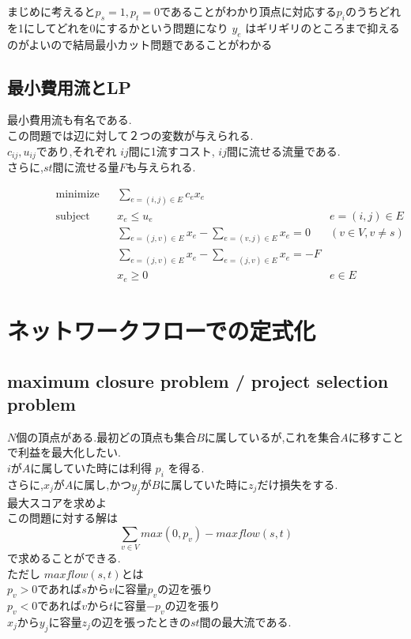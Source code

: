 \documentclass[13pt, a4paper, landscape]{jarticle}
\theoremstyle{nonitalic} %
\begin{document}
まじめに考えると$p_s=1, p_t=0$であることがわかり頂点に対応する$p_i$のうちどれを1にしてどれを0にするかという問題になり $y_e$ はギリギリのところまで抑えるのがよいので結局最小カット問題であることがわかる


\subsection{最小費用流とLP}

最小費用流も有名である. \\
この問題では辺に対して２つの変数が与えられる. \\
$c_{ij}, u_{ij}$であり,それぞれ $ij$間に1流すコスト, $ij$間に流せる流量である. \\
さらに,$st$間に流せる量$F$も与えられる.

\begin{align}
 &&&&&\textrm{minimize}   && \sum_{e=(i,j)\in E} c_e x_e  \\
 &&&&&\textrm{subject to} && x_{e} \leq u_e & e = (i,j) \in E \\
 &&&&&                    && \sum_{e = (j,v) \in E} x_e - \sum_{e=(v,j) \in E} x_e= 0 & (v \in V, v\neq s) &&&&& \\
 &&&&&                    && \sum_{e=(j,v) \in E} x_e - \sum_{e=(j,v)\in E} x_e = -F \\
 &&&&&                    && x_e \geq 0 & e \in E &&&&&
\end{align}



\section{ネットワークフローでの定式化}
\subsection{maximum closure problem / project selection problem}
$N$個の頂点がある.最初どの頂点も集合$B$に属しているが,これを集合$A$に移すことで利益を最大化したい. \\
$i$が$A$に属していた時には利得 $p_i$ を得る. \\
さらに,$x_j$が$A$に属し,かつ$y_j$が$B$に属していた時に$z_j$だけ損失をする. \\
最大スコアを求めよ \\


この問題に対する解は
\[ \sum_{v \in V } max(0,p_v) - maxflow(s,t) \]
で求めることができる.\\
ただし $maxflow(s,t) $とは\\
$p_v>0$であれば$s$から$v$に容量$p_v$の辺を張り\\
$p_v<0$であれば$v$から$t$に容量$-p_v$の辺を張り \\
$x_j$から$y_j$に容量$z_j$の辺を張ったときの$st$間の最大流である.
\end{document}
